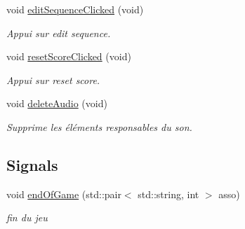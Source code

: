 \begin{DoxyCompactItemize}
\mbox{\label{class_super_simon_a4dd6e368e1dca177272e937209ff4974}} 
void \hyperlink{class_super_simon_a4dd6e368e1dca177272e937209ff4974}{edit\+Sequence\+Clicked} (void)
\begin{DoxyCompactList}\small\item\em Appui sur edit sequence. \end{DoxyCompactList}\item 
void \hyperlink{class_super_simon_a81bff9afba77880d36563aac5534ccd3}{reset\+Score\+Clicked} (void)
\begin{DoxyCompactList}\small\item\em Appui sur reset score. \end{DoxyCompactList}\item 
\mbox{\label{class_super_simon_aa8c1d5cee800c30c2eda3d4e32a438eb}} 
void \hyperlink{class_super_simon_aa8c1d5cee800c30c2eda3d4e32a438eb}{delete\+Audio} (void)
\begin{DoxyCompactList}\small\item\em Supprime les éléments responsables du son. \end{DoxyCompactList}\end{DoxyCompactItemize}
\subsection*{Signals}
\begin{DoxyCompactItemize}
\item 
\mbox{\label{class_super_simon_ac03f5803072330be308372659c5ffb1c}} 
void \hyperlink{class_super_simon_ac03f5803072330be308372659c5ffb1c}{end\+Of\+Game} (std\+::pair$<$ std\+::string, int $>$ asso)
\begin{DoxyCompactList}\small\item\em fin du jeu \end{DoxyCompactList}\end{DoxyCompactItemize}
